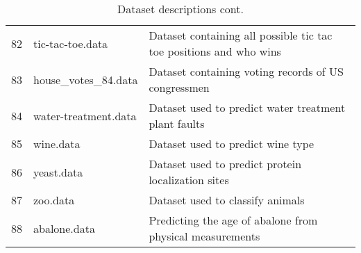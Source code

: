 \begin{table}
{\begin{tabular}{|l|l|l|}
82 &                         tic-tac-toe.data & Dataset containing all possible tic tac toe positions and who wins\\
83 &                      house\_votes\_84.data & Dataset containing voting records of US congressmen\\
84 &                     water-treatment.data & Dataset used to predict water treatment plant faults\\
85 &                                wine.data & Dataset used to predict wine type\\
86 &                               yeast.data & Dataset used to predict protein localization sites\\
87 &                                 zoo.data & Dataset used to classify animals\\
88 &                             abalone.data &  Predicting the age of abalone from physical measurements\\
\bottomrule
\end{tabular}}
\caption{Dataset descriptions cont.}
\end{table}
\par

\pagebreak
